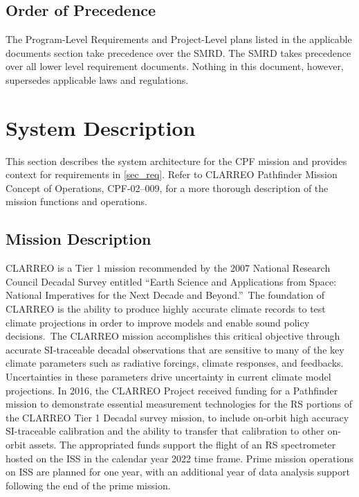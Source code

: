 \section{Order of Precedence }
\label{orderofprecedence}

The Program-Level Requirements and Project-Level plans listed in the applicable documents section take precedence over the \gls{SMRD}. The \gls{SMRD} takes precedence over all lower level requirement documents. Nothing in this document, however, supersedes applicable laws and regulations.

\chapter{System Description  }
\label{sec_desc}

This section describes the system architecture for the \gls{CPF} mission and provides context for requirements in \autoref{sec_req}. Refer to \gls{CLARREO} Pathfinder Mission Concept of Operations, \gls{CPF}-02--009, for a more thorough description of the mission functions and operations.

\section{Mission Description }
\label{missiondescription}

\gls{CLARREO} is a Tier 1 mission recommended by the 2007 National Research Council Decadal Survey entitled ``Earth Science and Applications from Space: National Imperatives for the Next Decade and Beyond.'' The foundation of \gls{CLARREO} is the ability to produce highly accurate climate records to \gls{test} climate projections in order to improve models and enable sound policy decisions. The \gls{CLARREO} mission accomplishes this critical objective through accurate \gls{SI}-traceable decadal observations that are sensitive to many of the key climate parameters such as radiative forcings, climate responses, and feedbacks. Uncertainties in these parameters drive uncertainty in current climate model projections. In 2016, the \gls{CLARREO} Project received funding for a Pathfinder mission to demonstrate essential \gls{measure}ment technologies for the \gls{RS} portions of the \gls{CLARREO} Tier 1 Decadal survey mission, to include on-orbit high accuracy \gls{SI}-traceable calibration and the ability to transfer that calibration to other on-orbit assets. The appropriated funds support the flight of an \gls{RS} spectrometer hosted on the \gls{ISS} in the calendar year 2022 time frame. Prime mission operations on \gls{ISS} are planned for one year, with an additional year of data \gls{analysis} support following the end of the prime mission.

